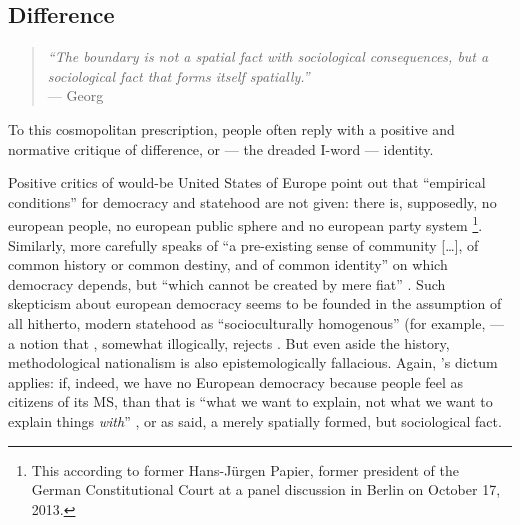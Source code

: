 \subsection[Difference]{Difference} \label{sec:ID-Difference}

\begin{quote}
	\emph{``The boundary is not a spatial fact with sociological consequences, but a sociological fact that forms itself spatially.''} \\
	--- Georg \citet[142]{Simmel1903}
\end{quote}

To this cosmopolitan prescription, people often reply with a positive and normative critique of difference, or --- the dreaded I-word --- identity.

Positive critics of would-be United States of Europe point out that ``empirical conditions'' for democracy and statehood are not given:
there is, supposedly, no european people, no european public sphere and no european party system
\footnote{
	This according to former Hans-Jürgen Papier, former president of the German Constitutional Court at a panel discussion in Berlin on October 17, 2013.
}.
Similarly, \citeauthor{Scharpf1997} more carefully 	speaks of ``a pre-existing sense of community [\ldots], of common history or common destiny, and of common identity'' on which democracy depends, but ``which cannot be created by mere fiat'' \citeyearpar[20]{Scharpf1997}.
Such skepticism about european democracy seems to be founded in the assumption of all hitherto, modern statehood as ``socioculturally homogenous'' (for example, \citealt[93]{BeckGrande-2007-aa} --- a notion that \citeauthor{Scharpf1997}, somewhat illogically, rejects \citeyearpar[20]{Scharpf1997}.
But even aside the history, methodological nationalism is also epistemologically fallacious.
Again, \citeauthor{Brubaker-2002-aa}'s dictum applies:
if, indeed, we have no European democracy because people feel as citizens of its \gls{MS}, than that is ``what we want to explain, not what we want to explain things \emph{with}'' \citeyearpar[165, emphasis in original]{Brubaker-2002-aa}, or as \citeauthor{Simmel1903} said, a merely spatially formed, but sociological fact.

